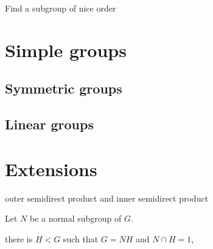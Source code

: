 \documentclass{../exp}
\begin{document}
Find a subgroup of nice order


\section{Simple groups}

\subsection{Symmetric groups}

\subsection{Linear groups}

\section{Extensions}

outer semidirect product and inner semidirect product
\begin{prop}
Let $N$ be a normal subgroup of $G$.
\begin{cond}
\item there is $H<G$ such that $G=NH$ and $N\cap H=1$,
\item 
\item
\end{cond}
\end{prop}
\end{document}
